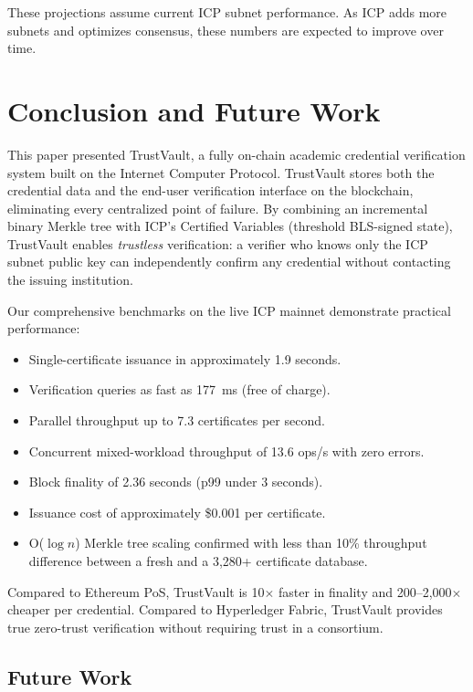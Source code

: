 \documentclass[conference]{IEEEtran}
\begin{document}
These projections assume current ICP subnet performance. As ICP adds more subnets and optimizes consensus, these numbers are expected to improve over time.

\section{Conclusion and Future Work}
\label{sec:conclusion}

This paper presented TrustVault, a fully on-chain academic credential verification system built on the Internet Computer Protocol. TrustVault stores both the credential data and the end-user verification interface on the blockchain, eliminating every centralized point of failure. By combining an incremental binary Merkle tree with ICP's Certified Variables (threshold BLS-signed state), TrustVault enables \emph{trustless} verification: a verifier who knows only the ICP subnet public key can independently confirm any credential without contacting the issuing institution.

Our comprehensive benchmarks on the live ICP mainnet demonstrate practical performance:
\begin{itemize}[leftmargin=*]
  \item Single-certificate issuance in approximately 1.9 seconds.
  \item Verification queries as fast as 177~ms (free of charge).
  \item Parallel throughput up to 7.3 certificates per second.
  \item Concurrent mixed-workload throughput of 13.6 ops/s with zero errors.
  \item Block finality of 2.36 seconds (p99 under 3 seconds).
  \item Issuance cost of approximately \$0.001 per certificate.
  \item O($\log n$) Merkle tree scaling confirmed with less than 10\% throughput difference between a fresh and a 3,280+ certificate database.
\end{itemize}

Compared to Ethereum PoS, TrustVault is 10$\times$ faster in finality and 200--2{,}000$\times$ cheaper per credential. Compared to Hyperledger Fabric, TrustVault provides true zero-trust verification without requiring trust in a consortium.

\subsection{Future Work}
\end{document}
